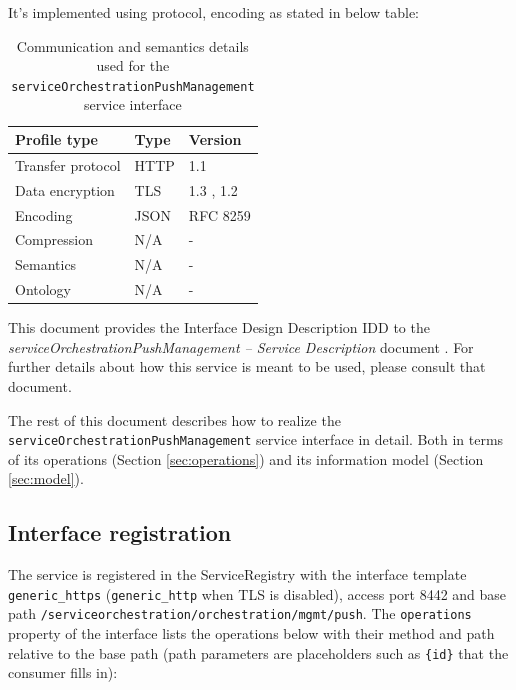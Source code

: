 \documentclass[a4paper]{arrowhead}
\begin{document}
It's implemented using protocol, encoding as stated in below table:
\begin{table}[ht!]
  \centering
  \begin{tabular}{|l|l|l|}
    \hline
    \rowcolor{gray!33} Profile type & Type & Version \\ \hline
    Transfer protocol & HTTP & 1.1 \cite{rfc9112} \\ \hline
    Data encryption & TLS & 1.3 \cite{rfc8446}, 1.2 \cite{rfc5246} \\ \hline
    Encoding & JSON & RFC 8259 \cite{rfc8259} \\ \hline
    Compression & N/A & - \\ \hline
    Semantics & N/A & - \\ \hline
    Ontology & N/A & - \\ \hline
  \end{tabular}
  \caption{Communication and semantics details used for the \texttt{service\allowbreak{}Orchestration\allowbreak{}Push\allowbreak{}Management} service interface}
  \label{tab:comunication_semantics_profile}
\end{table}

This document provides the Interface Design Description IDD to the \textit{serviceOrchestrationPushManagement -- Service Description} document \cite{ssso-serviceOrchestrationPushManagement-sd}.
For further details about how this service is meant to be used, please consult that document.

The rest of this document describes how to realize the \texttt{service\allowbreak{}Orchestration\allowbreak{}Push\allowbreak{}Management} service
interface in detail. Both in terms of its operations (Section \ref{sec:operations}) and its information model (Section \ref{sec:model}).

\subsection{Interface registration}

The service is registered in the ServiceRegistry with the interface template \texttt{generic\_\allowbreak{}https} (\texttt{generic\_\allowbreak{}http} when TLS is disabled), access port 8442 and base path \texttt{/\allowbreak{}serviceorchestration/\allowbreak{}orchestration/\allowbreak{}mgmt/\allowbreak{}push}. The \texttt{operations} property of the interface lists the operations below with their method and path relative to the base path (path parameters are placeholders such as \texttt{\{id\}} that the consumer fills in):
\end{document}
